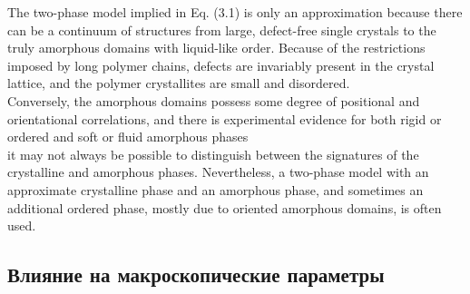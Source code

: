 The two-phase model implied in Eq. (3.1) is only an approximation because
there can be a continuum of structures from large, defect-free single crystals to
the truly amorphous domains with liquid-like order. Because of the restrictions
imposed by long polymer chains, defects are invariably present in the crystal lattice,
and the polymer crystallites are small and disordered.\\
Conversely, the amorphous
domains possess some degree of positional and orientational correlations, and there
is experimental evidence for both rigid or ordered and soft or fluid amorphous phases\\
it may not always be possible to distinguish between the signatures
of the crystalline and amorphous phases. Nevertheless, a two-phase model with
an approximate crystalline phase and an amorphous phase, and sometimes an additional
ordered phase, mostly due to oriented amorphous domains, is often used.\\



\subsection{Влияние на макроскопические параметры}





	